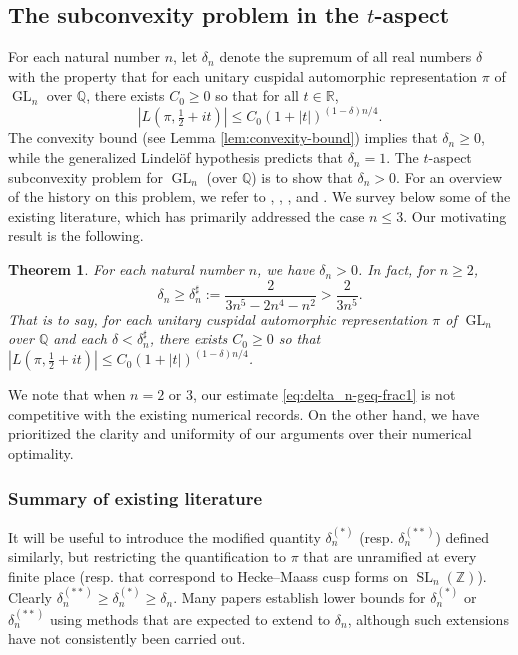 \documentclass[reqno]{amsart}
\DeclareMathOperator{\SL}{SL}
\DeclareMathOperator{\GL}{GL}
\theoremstyle{plain} \newtheorem{theorem} {Theorem}
\theoremstyle{definition} \newtheorem{definition} [theorem] {Definition}
\theoremstyle{itplain} %
\numberwithin{equation}{section}
\numberwithin{theorem}{section}
\renewcommand{\geq}{\geqslant}
\renewcommand{\leq}{\leqslant}
\begin{document}
\subsection{The subconvexity problem in the $t$-aspect}\label{sec:subc-probl-t}
For each natural number $n$, let $\delta_n$ denote the supremum of all real numbers $\delta$ with the property that for each unitary cuspidal automorphic representation $\pi$ of $\GL_n$ over $\mathbb{Q}$, there exists $C_0 \geq 0$ so that for all $t \in \mathbb{R}$,
\begin{equation}\label{eq:lpi-tfrac12-+}
  |L(\pi,\tfrac{1}{2} + i  t)| \leq C_0 (1 + |t|)^{(1 - \delta) n/4}.
\end{equation}
The convexity bound (see Lemma \ref{lem:convexity-bound}) implies that $\delta_n \geq 0$, while the generalized Lindel\"{o}f hypothesis predicts that $\delta_n = 1$.  The $t$-aspect subconvexity problem for $\GL_n$ (over $\mathbb{Q}$) is to show that $\delta_n > 0$.  For an overview of the history on this problem, we refer to \cite{MR1403937}, \cite[\S2]{MR1826269}, \cite{MichelVenkateshICM}, \cite[\S4, \S5]{MR2331346} and \cite{MR3966770}.  We survey below some of the existing literature, which has primarily addressed the case $n \leq 3$.  Our motivating result is the following.
\begin{theorem}\label{thm:t-aspect}
  For each natural number $n$, we have $\delta_n > 0$.  In fact, for $n \geq 2$,
  \begin{equation}\label{eq:delta_n-geq-frac1}
    \delta_n \geq \delta_n ^\sharp := \frac{2}{ 3 n^5 - 2 n^4 - n^2 } > \frac{2}{3 n^5}.
  \end{equation}
  That is to say, for each unitary cuspidal automorphic representation $\pi$ of $\GL_n$ over $\mathbb{Q}$ and each $\delta < \delta_n ^\sharp$, there exists $C_0 \geq 0$ so that $|L(\pi,\tfrac{1}{2} + i t)| \leq C_0 (1 + |t|)^{(1 - \delta) n/4}$.
\end{theorem}

We note that when $n=2$ or $3$, our estimate \eqref{eq:delta_n-geq-frac1} is not competitive with the existing numerical records.  On the other hand, we have prioritized the clarity and uniformity of our arguments over their numerical optimality.


\subsubsection*{Summary of existing literature}
It will be useful to introduce the modified quantity $\delta_n^{(*)}$ (resp. $\delta_{n}^{(**)}$) defined similarly, but restricting the quantification to $\pi$ that are unramified at every finite place (resp. that correspond to Hecke--Maass cusp forms on $\SL_n(\mathbb{Z})$).  Clearly $\delta_n^{(**)} \geq \delta_n^{(*)} \geq \delta_n$.  Many papers establish lower bounds for $\delta_n^{(*)}$ or $\delta_n^{(**)}$ using methods that are expected to extend to $\delta_n$, although such extensions have not consistently been carried out.
\end{document}
